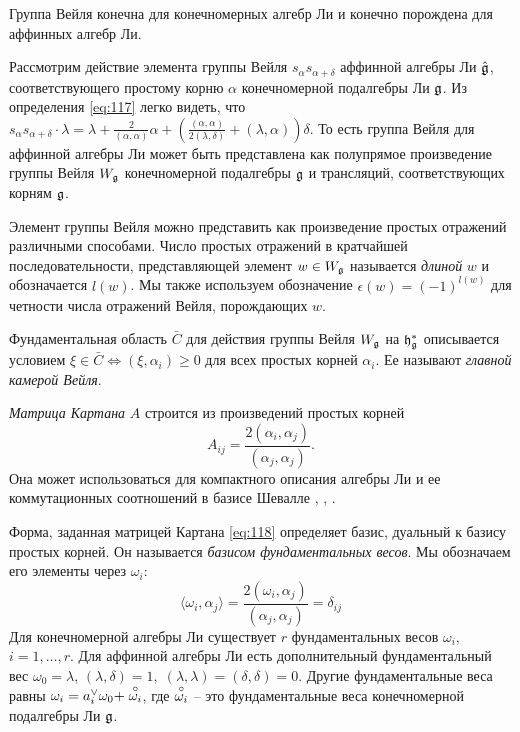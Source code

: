 Группа Вейля конечна для конечномерных алгебр Ли и конечно порождена для аффинных алгебр Ли.

Рассмотрим действие элемента группы Вейля $s_{\alpha}s_{\alpha+\delta}$ аффинной алгебры Ли   $\hat{\mathfrak{g}}$, соответствующего простому корню  $\alpha$ конечномерной подалгебры Ли $\mathfrak{g}$. Из определения  \eqref{eq:117} легко видеть, что $s_{\alpha}s_{\alpha+\delta} \cdot \lambda=\lambda+\frac{2}{(\alpha,\alpha)}\alpha+\left(\frac{(\alpha,\alpha)}{2 (\lambda,\delta)}+(\lambda,\alpha)\right) \delta$. То есть группа Вейля для аффинной алгебры Ли может быть представлена как полупрямое произведение группы Вейля $W_{\mathfrak{g}}$ конечномерной подалгебры  $\mathfrak{g}$ и трансляций, соответствующих корням $\mathfrak{g}$. 

Элемент группы Вейля можно представить как произведение простых отражений различными способами. Число простых отражений в кратчайшей последовательности, представляющей элемент\; $w\in W_{\mathfrak{g}}$ называется {\it длиной}  $w$ и обозначается $l(w)$. Мы также используем обозначение $\epsilon(w)=(-1)^{l(w)}$ для четности числа отражений Вейля, порождающих $w$. 

Фундаментальная область $\bar{C}$ для действия группы Вейля $W_{\mathfrak{g}}$ на $\mathfrak{h}_{\mathfrak{g}}^{*}$ описывается условием $\xi\in \bar{C}\Leftrightarrow (\xi,\alpha_{i})\geq 0$ для всех простых корней $\alpha_{i}$. Ее называют {\it главной камерой Вейля}. 

{\it Матрица Картана} $A$ строится из произведений простых корней
\begin{equation}
  \label{eq:118}
  A_{ij}=\frac{2(\alpha_{i},\alpha_{j})}{(\alpha_{j},\alpha_{j})}.
\end{equation}
Она может использоваться для компактного описания алгебры Ли и ее коммутационных соотношений в базисе Шевалле \cite{humphreys1997introduction}, \cite{fulton1991representation}, \cite{bourbaki2002lie}.

Форма, заданная матрицей Картана \eqref{eq:118} определяет базис, дуальный к базису простых корней.  Он называется  {\it базисом фундаментальных весов}. Мы обозначаем его элементы через $\omega_i$:
\begin{equation}
  \label{eq:20}
  \langle\omega_i,\alpha_j\rangle=\frac{2(\omega_{i},\alpha_{j})}{(\alpha_{j},\alpha_{j})}=\delta_{ij}
\end{equation}
Для конечномерной алгебры Ли существует $r$ фундаментальных весов $\omega_{i}$, $i=1,\dots, r$. Для аффинной алгебры Ли есть дополнительный фундаментальный вес $\omega_0=\lambda$, $(\lambda,\delta)=1, \; (\lambda,\lambda)=(\delta,\delta)=0$. Другие фундаментальные веса равны $\omega_i=a_i^{\vee} \omega_0 +\stackrel{\circ }{\omega_i}$, где $\stackrel{\circ }{\omega_i}$ -- это фундаментальные веса конечномерной подалгебры Ли $\mathfrak{g}$.

